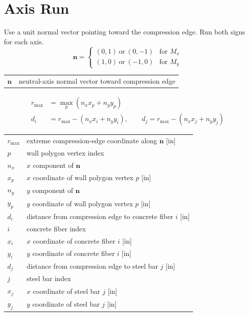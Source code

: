 \documentclass[10pt]{article}
\begin{document}
\section{Axis Run}

Use a unit normal vector pointing toward the compression edge. Run both signs for each axis.
\begin{equation}
\mathbf n =
\begin{cases}
(0,1)\ \text{or}\ (0,-1) & \text{for } M_x \\
(1,0)\ \text{or}\ (-1,0) & \text{for } M_y
\end{cases}
\end{equation}

{\ttfamily\footnotesize
\begin{tabular}{@{}ll@{}}
$\mathbf n$ & neutral-axis normal vector toward compression edge \\
\end{tabular}
}

\begin{equation}
\begin{aligned}
r_{\max} &= \max_p(n_x x_p+n_y y_p) \\
d_i &= r_{\max}-(n_x x_i+n_y y_i), \qquad
d_j = r_{\max}-(n_x x_j+n_y y_j)
\end{aligned}
\end{equation}

{\ttfamily\footnotesize
\begin{tabular}{@{}ll@{}}
$r_{\max}$ & extreme compression-edge coordinate along $\mathbf n$ [in] \\
$p$ & wall polygon vertex index \\
$n_x$ & $x$ component of $\mathbf n$ \\
$x_p$ & $x$ coordinate of wall polygon vertex $p$ [in] \\
$n_y$ & $y$ component of $\mathbf n$ \\
$y_p$ & $y$ coordinate of wall polygon vertex $p$ [in] \\
$d_i$ & distance from compression edge to concrete fiber $i$ [in] \\
$i$ & concrete fiber index \\
$x_i$ & $x$ coordinate of concrete fiber $i$ [in] \\
$y_i$ & $y$ coordinate of concrete fiber $i$ [in] \\
$d_j$ & distance from compression edge to steel bar $j$ [in] \\
$j$ & steel bar index \\
$x_j$ & $x$ coordinate of steel bar $j$ [in] \\
$y_j$ & $y$ coordinate of steel bar $j$ [in] \\
\end{tabular}
}
\end{document}
